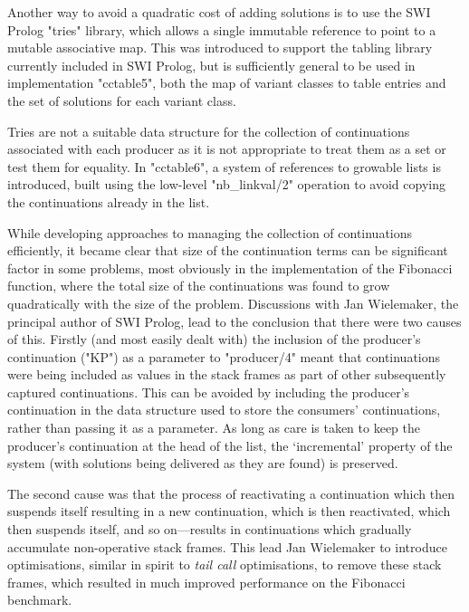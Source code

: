 Another way to avoid a quadratic cost of adding solutions is to use the SWI Prolog
"tries" library, which allows a single immutable reference to point to a mutable
associative map. This was introduced to support the tabling library currently included
in SWI Prolog, but is sufficiently general to be used in implementation "cctable5", 
both the map of variant classes to table entries and the set of solutions for each
variant class.

Tries are not a suitable data structure for the collection of continuations associated
with each producer as it is not appropriate to treat them as a set or test them for equality.
In "cctable6", a system of references to growable lists is introduced, built using
the low-level "nb_linkval/2" operation to avoid copying the continuations already in the
list.

While developing approaches to managing the collection of continuations efficiently,
it became clear that size of the continuation terms can be significant factor in some problems, 
most obviously in the implementation of the Fibonacci function, where the total size
of the continuations was found to grow quadratically with the size of the problem.
Discussions with Jan Wielemaker, the principal author of SWI Prolog, lead to the conclusion
that there were two causes of this. Firstly (and most easily dealt with) the inclusion
of the producer's continuation ("KP") as a parameter to "producer/4" meant that continuations
were being included as values in the stack frames as part of other subsequently captured continuations.
This can be avoided by including the producer's continuation in the data structure used
to store the consumers' continuations, rather than passing it as a parameter. As long
as care is taken to keep the producer's continuation at the head of the list, the 
`incremental' property of the system (with solutions being delivered as they are found)
is preserved.

The second cause was that the process of reactivating a continuation which then suspends itself
resulting in a new continuation, which is then reactivated, which then suspends itself,
and so on---results in continuations which gradually accumulate non-operative stack frames.
This lead Jan Wielemaker to introduce optimisations, similar in spirit to \emph{tail call}
optimisations, to remove these stack frames, which resulted in much improved performance
on the Fibonacci benchmark.

